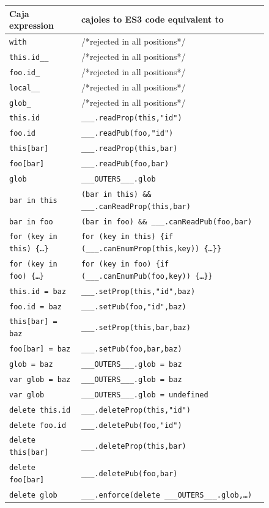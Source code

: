 \documentclass[letterpaper,twocolumn,10pt]{article}
\newcommand{\code}[1]{{\tt {#1}}}              %
\begin{document}
\begin{figure}
\begin{tabular}{ll}
  Caja expression    & cajoles to ES3 code equivalent to\\ 
  \hline
  \code{with}        & /*rejected in all positions*/ \\
  \hline
  \code{this.id\_\_} & /*rejected in all positions*/ \\
  \code{foo.id\_}    & /*rejected in all positions*/ \\      
  \code{local\_\_}   & /*rejected in all positions*/ \\        
  \code{glob\_}      & /*rejected in all positions*/ \\        
  \hline
  \code{this.id}     & \code{\_\_\_.readProp(this,"id")}\\
  \code{foo.id}      & \code{\_\_\_.readPub(foo,"id")} \\
  \code{this[bar]}   & \code{\_\_\_.readProp(this,bar)} \\
  \code{foo[bar]}    & \code{\_\_\_.readPub(foo,bar)}  \\
  \code{glob}        & \code{\_\_\_OUTERS\_\_\_.glob} \\
  \hline
  \code{bar in this}           
    & \code{(bar in this) \&\& \_\_\_.canReadProp(this,bar)} \\
  \code{bar in foo}            
    & \code{(bar in foo) \&\& \_\_\_.canReadPub(foo,bar)} \\
  \code{for (key in this)\ \{\ldots\}} 
    &\code{for (key in this)
     \{if (\_\_\_.canEnumProp(this,key))\ \{\ldots\}\}}\\
  \code{for (key in foo)\ \{\ldots\}}  
    & \code{for (key in foo)
     \{if (\_\_\_.canEnumPub(foo,key))\ \{\ldots\}\}} \\
  \hline
  \code{this.id = baz}    & \code{\_\_\_.setProp(this,"id",baz)} \\
  \code{foo.id = baz}     & \code{\_\_\_.setPub(foo,"id",baz)} \\
  \code{this[bar] = baz}  & \code{\_\_\_.setProp(this,bar,baz)} \\
  \code{foo[bar] = baz}   & \code{\_\_\_.setPub(foo,bar,baz)} \\
  \code{glob = baz}       & \code{\_\_\_OUTERS\_\_\_.glob = baz} \\
  \code{var glob = baz}   & \code{\_\_\_OUTERS\_\_\_.glob = baz} \\
  \code{var glob}         & \code{\_\_\_OUTERS\_\_\_.glob = undefined} \\
  \hline               
  \code{delete this.id}   & \code{\_\_\_.deleteProp(this,"id")} \\
  \code{delete foo.id}    & \code{\_\_\_.deletePub(foo,"id")} \\
  \code{delete this[bar]} & \code{\_\_\_.deleteProp(this,bar)} \\
  \code{delete foo[bar]}  & \code{\_\_\_.deletePub(foo,bar)} \\
  \code{delete glob}      
         & \code{\_\_\_.enforce(delete \_\_\_OUTERS\_\_\_.glob,\ldots)} \\
\end{tabular}


\end{figure}
\end{document}
